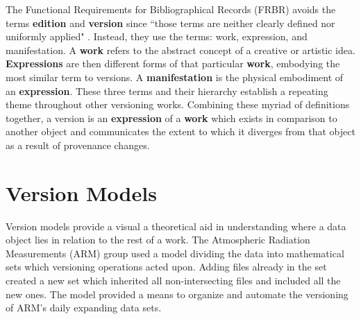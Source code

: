 The Functional Requirements for Bibliographical Records (FRBR) avoids the terms \textbf{edition} and \textbf{version} since ``those terms are neither clearly defined nor uniformly applied" \cite{frbr}.
Instead, they use the terms: work, expression, and manifestation.
A \textbf{work} refers to the abstract concept of a creative or artistic idea.
\textbf{Expressions} are then different forms of that particular \textbf{work}, embodying the most similar term to versions.
A \textbf{manifestation} is the physical embodiment of an \textbf{expression}.
These three terms and their hierarchy establish a repeating theme throughout other versioning works.
Combining these myriad of definitions together, a version is an \textbf{expression} of a \textbf{work} which exists in comparison to another object and communicates the extent to which it diverges from that object as a result of provenance changes.


\section{Version Models} \label{sec:models}

Version models provide a visual a theoretical aid in understanding where a data object lies in relation to the rest of a work.
The Atmospheric Radiation Measurements (ARM) group used a model dividing the data into mathematical sets which versioning operations acted upon\cite{6906868}.
Adding files already in the set created a new set which inherited all non-intersecting files and included all the new ones.
The model provided a means to organize and automate the versioning of ARM's daily expanding data sets.

